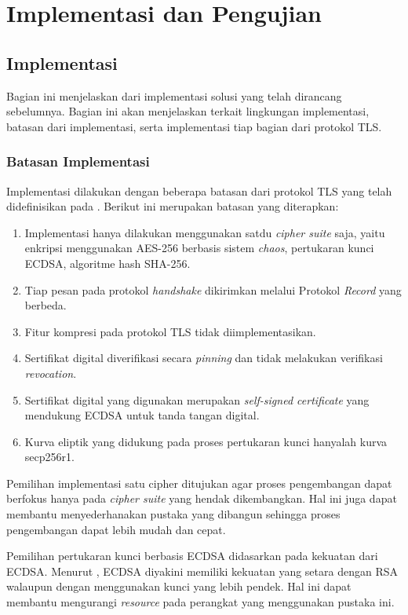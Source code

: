 \chapter{Implementasi dan Pengujian}

\section{Implementasi}

Bagian ini menjelaskan dari implementasi solusi yang telah dirancang sebelumnya. Bagian ini akan menjelaskan terkait lingkungan implementasi, batasan dari implementasi, serta implementasi tiap bagian dari protokol TLS.

\subsection{Batasan Implementasi}
Implementasi dilakukan dengan beberapa batasan dari protokol TLS yang telah didefinisikan pada \textcite{rfc5246}. Berikut ini merupakan batasan yang diterapkan:

\begin{enumerate}
  \item Implementasi hanya dilakukan menggunakan satdu \emph{cipher suite} saja, yaitu enkripsi menggunakan AES-256 berbasis sistem \emph{chaos}, pertukaran kunci ECDSA, algoritme hash SHA-256.
  \item Tiap pesan pada protokol \emph{handshake} dikirimkan melalui Protokol \emph{Record} yang berbeda.
  \item Fitur kompresi pada protokol TLS tidak diimplementasikan.
  \item Sertifikat digital diverifikasi secara \emph{pinning} dan tidak melakukan verifikasi \emph{revocation}.
  \item Sertifikat digital yang digunakan merupakan \emph{self-signed certificate} yang mendukung ECDSA untuk tanda tangan digital.
  \item Kurva eliptik yang didukung pada proses pertukaran kunci hanyalah kurva secp256r1.
\end{enumerate}
  
Pemilihan implementasi satu cipher ditujukan agar proses pengembangan dapat berfokus hanya pada \emph{cipher suite} yang hendak dikembangkan. Hal ini juga dapat membantu menyederhanakan pustaka yang dibangun sehingga proses pengembangan dapat lebih mudah dan cepat. 

Pemilihan pertukaran kunci berbasis ECDSA didasarkan pada kekuatan dari ECDSA. Menurut \textcite{munir2019}, ECDSA diyakini memiliki kekuatan yang setara dengan RSA walaupun dengan menggunakan kunci yang lebih pendek. Hal ini dapat membantu mengurangi \emph{resource} pada perangkat yang menggunakan pustaka ini.

